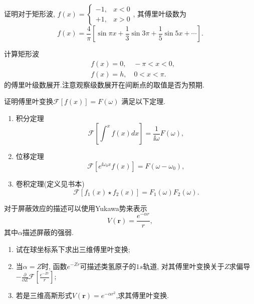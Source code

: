 \documentclass[11pt]{article}
\begin{document}
\begin{hwproblem}{}
证明对于矩形波,
$f(x)=\left\{ \begin{array}{ll}-1, & x<0 \\ +1, &  x>0\end{array}\right.$, 其傅里叶级数为
$$
f(x)=\frac{4}{\pi} \left[  \sin \pi x+\frac{1}{3} \sin 3 \pi+\frac{1}{5 } \sin 5 x+\cdots \right].
$$
\end{hwproblem}


\begin{hwproblem}{}
计算矩形波$$
\begin{aligned}
& f(x)=0, \quad-\pi<x<0, \\
& f(x)=h, \quad 0<x<\pi .
\end{aligned}
$$
的傅里叶级数展开.注意观察级数展开在间断点的取值是否为预期.
\end{hwproblem}

\vspace{0.5cm}
  
\begin{hwproblem}{}
    证明傅里叶变换$\mathcal{F}[f(x)] = F(\omega)$ 满足以下定理.
    \begin{enumerate}
      
        \item 积分定理
        $$
            \mathcal{F} [ \int^{x} f(x) dx ] = \frac{1}{\ii \omega} F(\omega),
        $$
        \item 位移定理
        $$
            \mathcal{F} [ e^{\ii \omega_0 x} f(x) ] = F(\omega - \omega_0),
        $$
        \item 卷积定理(定义见书本)
        $$
            \mathcal{F} [f_1(x)\star f_2(x) ] = F_1(\omega) F_2(\omega).
        $$
      \end{enumerate}
\end{hwproblem}

\vspace{0.5cm}

\begin{hwproblem}{}
    对于屏蔽效应的描述可以使用Yukawa势来表示
$$
V(\mathbf{r}) = \frac{e^{-\alpha r}}{r},
$$
其中$\alpha$描述屏蔽的强弱.
\begin{enumerate}
  \item 试在球坐标系下求出三维傅里叶变换;
  \item 当$\alpha=Z$时, 函数$e^{-Zr}$可描述类氢原子的$1s$轨道, 对其傅里叶变换关于$Z$求偏导
  $-\frac{\partial}{\partial Z} \mathcal{F} \left[ \frac{e^{-Z r}}{r}\right]$;
  \item 若是三维高斯形式$V(\mathbf{r}) = e^{-\alpha r^2}$,求其傅里叶变换.
\end{enumerate}
\end{hwproblem}
\end{document}
